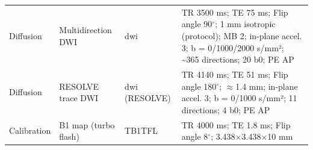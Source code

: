 \documentclass[11pt]{article}
\begin{document}
\begin{center}
\begin{minipage}{0.98\textwidth}
\begin{tabularx}{\textwidth}{@{}L{2.15cm}L{3.6cm}L{2.7cm}Y@{}}
Diffusion & Multidirection DWI & {\ttfamily\footnotesize dwi} & TR 3500 ms; TE 75 ms; Flip angle 90$^{\circ}$; 1 mm isotropic (protocol); MB 2; in-plane accel. 3; b = 0/1000/2000 s/mm²; \textasciitilde{}365 directions; 20 b0; PE AP \\
 Diffusion & RESOLVE trace DWI & {\ttfamily\footnotesize dwi (RESOLVE)} & TR 4140 ms; TE 51 ms; Flip angle 180$^{\circ}$; $\approx$1.4 mm; in-plane accel. 3; b = 0/1000 s/mm²; 11 directions; 4 b0; PE AP \\
Calibration & B1 map (turbo flash) & {\ttfamily\footnotesize TB1TFL} & TR 4000 ms; TE 1.8 ms; Flip angle 8$^{\circ}$; 3.438$\times$3.438$\times$10 mm \\
\bottomrule
\end{tabularx}
\end{minipage}
\end{center}
\end{document}
